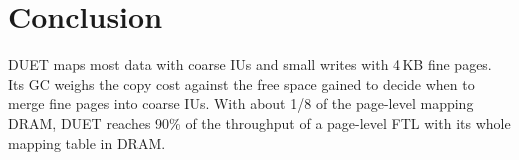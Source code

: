 \section{Conclusion}
\label{sec:conclusion}
DUET maps most data with coarse IUs and small writes with 4\,KB fine pages. Its GC weighs
the copy cost against the free space gained to decide when to merge fine pages into coarse IUs. With about 1/8 of the page-level mapping DRAM, DUET reaches 90\% of the
throughput of a page-level FTL with its whole mapping table in DRAM.

